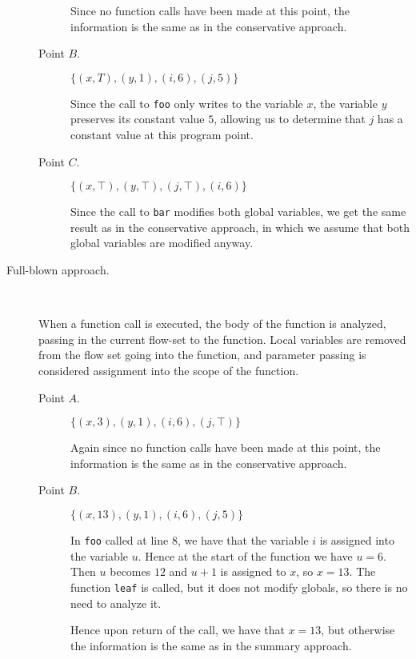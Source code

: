 \documentclass[letterpaper,11pt]{article}
\newcommand{\codesnip}{\texttt}
\begin{document}
\begin{description}
\begin{description}
        Since no function calls have been made at this point, the information
        is the same as in the conservative approach.

      \item[Point $B$.]
        $\{ (x, T), (y, 1), (i, 6), (j, 5) \}$

        Since the call to \codesnip{foo} only writes to the variable $x$, the
        variable $y$ preserves its constant value $5$, allowing us to determine
        that $j$ has a constant value at this program point.

      \item[Point $C$.]
        $\{ (x, \top), (y, \top), (j, \top), (i, 6) \}$

        Since the call to \codesnip{bar} modifies both global variables, we get
        the same result as in the conservative approach, in which we assume
        that both global variables are modified anyway.
    \end{description}

  \item[Full-blown approach.] ~

    When a function call is executed, the body of the function is analyzed,
    passing in the current flow-set to the function. Local variables are
    removed from the flow set going into the function, and parameter passing is
    considered assignment into the scope of the function.

    \begin{description}
      \item[Point $A$.]
        $\{ (x, 3), (y, 1), (i, 6), (j, \top) \}$

        Again since no function calls have been made at this point, the
        information is the same as in the conservative approach.

      \item[Point $B$.]
        $\{ (x, 13), (y, 1), (i, 6), (j, 5) \}$

        In \codesnip{foo} called at line $8$, we have that the variable $i$
        is assigned into the variable $u$. Hence at the start of the function
        we have $u = 6$. Then $u$ becomes $12$ and $u + 1$ is assigned to $x$,
        so $x = 13$. The function \codesnip{leaf} is called, but it does not
        modify globals, so there is no need to analyze it.

        Hence upon return of the call, we have that $x = 13$, but otherwise the
        information is the same as in the summary approach.


\end{description}
\end{description}
\end{document}
